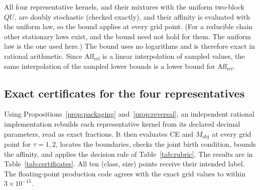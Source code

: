 All four representative kernels, and their mixtures with the uniform two-block $QU$, are doubly stochastic (checked exactly), and their affinity is evaluated with the uniform law, so the bound applies at every grid point. (For a reducible chain other stationary laws exist, and the bound need not hold for them. The uniform law is the one used here.) The bound uses no logarithms and is therefore exact in rational arithmetic. Since $\mathrm{Aff}_{\mathrm{ref}}$ is a linear interpolation of sampled values, the same interpolation of the sampled lower bounds is a lower bound for $\mathrm{Aff}_{\mathrm{ref}}$.

\subsection{Exact certificates for the four representatives}

Using Propositions~\ref{prop:packaging} and~\ref{prop:reversal}, an independent rational implementation rebuilds each representative kernel from its declared decimal parameters, read as exact fractions. It then evaluates CE and $M_{\mathrm{obj}}$ at every grid point for $\tau=1,2$, locates the boundaries, checks the joint birth condition, bounds the affinity, and applies the decision rule of Table~\ref{tab:rubric}. The results are in Table~\ref{tab:certificates}. All ten (class, size) points receive their intended label. The floating-point production code agrees with the exact grid values to within $3\times10^{-15}$.

